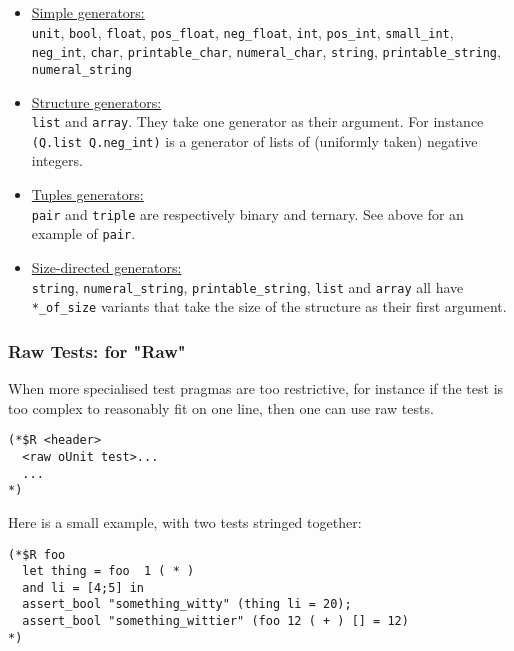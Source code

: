 \documentclass[a4paper,12pt]{article}
\begin{document}
\begin{itemize}
\item  \underline{Simple generators:}\\
\texttt{unit}, \texttt{bool}, \texttt{float}, \texttt{pos\_float},
\texttt{neg\_float}, \texttt{int}, \texttt{pos\_int}, \texttt{small\_int},
\texttt{neg\_int}, \texttt{char}, \texttt{printable\_char}, \texttt{numeral\_char},
\texttt{string}, \texttt{printable\_string},
\texttt{numeral\_string}

\item \underline{Structure generators:}\\
\texttt{list} and \texttt{array}. They take one generator as their argument. For instance
\texttt{(Q.list Q.neg\_int)} is a generator of lists of (uniformly taken) negative integers.

\item \underline{Tuples generators:}\\
\texttt{pair} and \texttt{triple} are respectively binary and ternary. See above for an example of
\texttt{pair}.

\item \underline{Size-directed generators:}\\
\texttt{string}, \texttt{numeral\_string}, \texttt{printable\_string}, \texttt{list}
and \texttt{array} all have \texttt{*\_of\_size}
variants that take the size of the structure as their first argument.
\end{itemize}

\subsubsection{Raw \ounit{} Tests:  for "Raw"}

When more specialised test pragmas are too restrictive, for instance if the test is too
complex to reasonably fit on one line, then one can use raw \ounit{} tests.

\begin{verbatim}
(*$R <header>
  <raw oUnit test>...
  ...
*)
\end{verbatim} 

Here is a small example, with two tests stringed together:

\begin{verbatim}
(*$R foo
  let thing = foo  1 ( * )
  and li = [4;5] in
  assert_bool "something_witty" (thing li = 20);
  assert_bool "something_wittier" (foo 12 ( + ) [] = 12)
*)
\end{verbatim}
\end{document}

